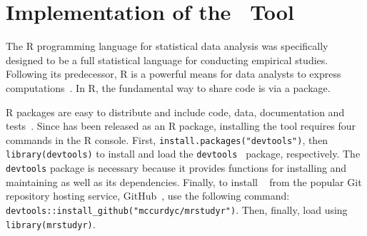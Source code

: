 \section{Implementation of the \mr~Tool}

The R programming language for statistical data analysis was specifically designed to
be a full statistical language for conducting empirical studies. Following its predecessor,
R is a powerful means for data analysts to express computations~\cite{ihaka1996r}.
In R, the fundamental way to share code is via a package.

R packages are easy to distribute and include code, data, documentation and tests~\cite{wickham2015r}.
Since \mr has been released as an R package, installing the tool requires 
four commands in the R console.
First, \texttt{install.packages("devtools")}, then {\small\texttt{library(devtools)}}
to install and load the {\small\texttt{devtools}}~\cite{devtools} package, respectively.
The \texttt{devtools} package is necessary because it provides functions for installing
and maintaining \mr as well as its dependencies. Finally, to install
\mr~\cite{tool} from the popular Git repository hosting service, GitHub~\cite{github},
use the following command: {\small\texttt{devtools::install\_github("mccurdyc/mrstudyr")}}.
Then, finally, load \mr using \texttt{library(mrstudyr)}.





